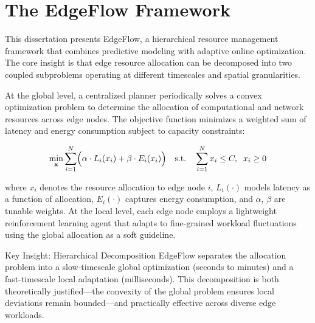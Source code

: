 \section{The EdgeFlow Framework}

This dissertation presents EdgeFlow, a hierarchical resource management framework that combines predictive modeling with adaptive online optimization. The core insight is that edge resource allocation can be decomposed into two coupled subproblems operating at different timescales and spatial granularities.

At the global level, a centralized planner periodically solves a convex optimization problem to determine the allocation of computational and network resources across edge nodes. The objective function minimizes a weighted sum of latency and energy consumption subject to capacity constraints:

\begin{equation}
\min_{\mathbf{x}} \sum_{i=1}^{N} \Bigl( \alpha \cdot L_i(x_i) + \beta \cdot E_i(x_i) \Bigr) \quad \text{s.t.} \quad \sum_{i=1}^{N} x_i \leq C,\;\; x_i \geq 0
\label{eq:global_opt}
\end{equation}

where $x_i$ denotes the resource allocation to edge node $i$, $L_i(\cdot)$ models latency as a function of allocation, $E_i(\cdot)$ captures energy consumption, and $\alpha$, $\beta$ are tunable weights. At the local level, each edge node employs a lightweight reinforcement learning agent that adapts to fine-grained workload fluctuations using the global allocation as a soft guideline.

\begin{keyconcept}{Key Insight: Hierarchical Decomposition}
EdgeFlow separates the allocation problem into a slow-timescale global optimization (seconds to minutes) and a fast-timescale local adaptation (milliseconds). This decomposition is both theoretically justified---the convexity of the global problem ensures local deviations remain bounded---and practically effective across diverse edge workloads.
\end{keyconcept}
